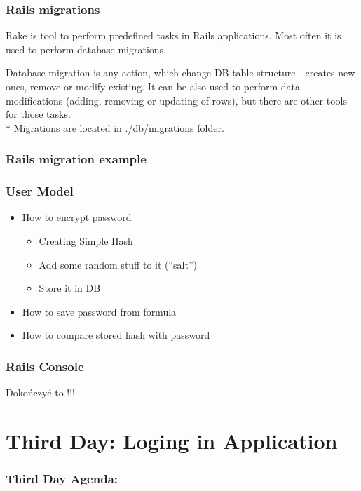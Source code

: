 \documentclass{beamer}
\theoremstyle{mystyle}
\begin{document}
    \begin{frame}
      \frametitle{Rails migrations}
      \begin{definition}[Rake]
        Rake is tool to perform predefined tasks in Rails applications. Most
        often it is used to perform database migrations.
      \end{definition}
      
      \begin{definition}[Migrations]
        Database migration is any action, which change DB table structure -
        creates new ones, remove or modify existing. It can be also used to
        perform data modifications (adding, removing or updating of rows), but
        there are other tools for those tasks.\\*
        Migrations are located in ./db/migrations folder.
      \end{definition}
      
      \databasemigrationuser
    \end{frame}
    
    \begin{frame}
      \frametitle{Rails migration example}
      \begin{example}
        \migrationuser
      \end{example}
    \end{frame}
    
    \begin{frame}
      \frametitle{User Model}
      \begin{itemize}
      \item How to encrypt password 
        \begin{itemize}
        \item Creating Simple Hash
        \item Add some random stuff to it (``salt'')
        \item Store it in DB
        \end{itemize}
      \item How to save password from formula
      \item How to compare stored hash with password 
      \end{itemize}
    \end{frame}
    
    \begin{frame}
      \frametitle{Rails Console}
      Dokończyć to !!!
    \end{frame}

\section{Third Day: Loging in Application}
    \begin{frame}
      \frametitle{Third Day Agenda:}
      \tableofcontents
      [
      currentsection,
      sectionstyle=hide/hide,
      subsectionstyle=show/show/hide
      ]
    \end{frame}
\end{document}
